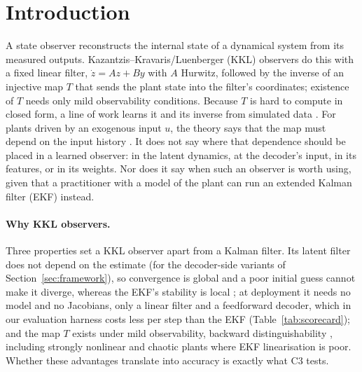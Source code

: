 \section{Introduction}\label{sec:intro}

A state observer reconstructs the internal state of a dynamical system from its measured outputs. Kazantzis--Kravaris/Luenberger (KKL) observers \citep{kazantzis1998,andrieu2006existence} do this with a fixed linear filter, $\dot z = Az + By$ with $A$ Hurwitz, followed by the inverse of an injective map $T$ that sends the plant state into the filter's coordinates; existence of $T$ needs only mild observability conditions. Because $T$ is hard to compute in closed form, a line of work learns it and its inverse from simulated data \citep{ramos2020,janny2021,peralez2021,niazi2023,buisson2023,niazi2025kkl}. For plants driven by an exogenous input $u$, the theory says that the map must depend on the input history \citep{bernard2019luenberger}. It does not say where that dependence should be placed in a learned observer: in the latent dynamics, at the decoder's input, in its features, or in its weights. Nor does it say when such an observer is worth using, given that a practitioner with a model of the plant can run an extended Kalman filter (EKF) instead.

\paragraph{Why KKL observers.} Three properties set a KKL observer apart from a Kalman filter. Its latent filter does not depend on the estimate (for the decoder-side variants of Section~\ref{sec:framework}), so convergence is global and a poor initial guess cannot make it diverge, whereas the EKF's stability is local \citep{reif1999stochastic}; at deployment it needs no model and no Jacobians, only a linear filter and a feedforward decoder, which in our evaluation harness costs less per step than the EKF (Table~\ref{tab:scorecard}); and the map $T$ exists under mild observability, backward distinguishability \citep{andrieu2006existence,bernard2019luenberger}, including strongly nonlinear and chaotic plants where EKF linearisation is poor. Whether these advantages translate into accuracy is exactly what C3 tests.

